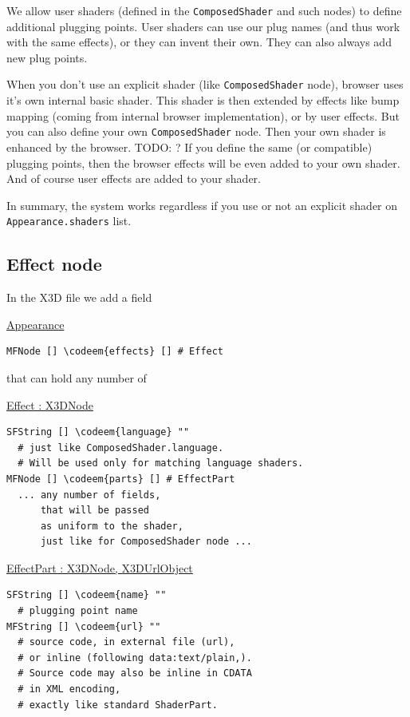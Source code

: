 \documentclass{acmsiggraph}                     %
\newenvironment{mycode}
{\begin{mycodecore}}
{\end{mycodecore}
\vspace{-0.1in}}
\newcommand*{\codeem}[1]{\textbf{#1}}
\begin{document}
We allow user shaders (defined in the \texttt{ComposedShader} and such nodes) to
define additional plugging points. User shaders can use our plug names
(and thus work with the same effects), or they can invent their
own. They can also always add new plug points.

When you don't use an explicit shader (like \texttt{ComposedShader} node),
browser uses it's own internal basic shader. This shader is then
extended by effects like bump mapping (coming from internal browser
implementation), or by user effects. But you can also define your own
\texttt{ComposedShader} node. Then your own shader is enhanced by the
browser. TODO: ? If you define the same (or compatible) plugging
points, then the browser effects will be even added to your own
shader. And of course user effects are added to your shader.

In summary, the system works regardless if you use or not an explicit
shader on \texttt{Appearance.shaders} list.

\subsection{Effect node}

In the X3D file we add a field

\begin{mycode}
\underline{Appearance}
\begin{Verbatim}[commandchars=\\\{\}]
MFNode [] \codeem{effects} [] # Effect
\end{Verbatim}
\end{mycode}

that can hold any number of

\begin{mycode}
\underline{Effect : X3DNode}
\begin{Verbatim}[commandchars=\\\{\}]
SFString [] \codeem{language} ""
  # just like ComposedShader.language.
  # Will be used only for matching language shaders.
MFNode [] \codeem{parts} [] # EffectPart
  ... any number of fields,
      that will be passed
      as uniform to the shader,
      just like for ComposedShader node ...
\end{Verbatim}
\end{mycode}

\begin{mycode}
\underline{EffectPart : X3DNode, X3DUrlObject}
\begin{Verbatim}[commandchars=\\\{\}]
SFString [] \codeem{name} ""
  # plugging point name
MFString [] \codeem{url} ""
  # source code, in external file (url),
  # or inline (following data:text/plain,).
  # Source code may also be inline in CDATA
  # in XML encoding,
  # exactly like standard ShaderPart.
\end{Verbatim}
\end{mycode}
\end{document}
